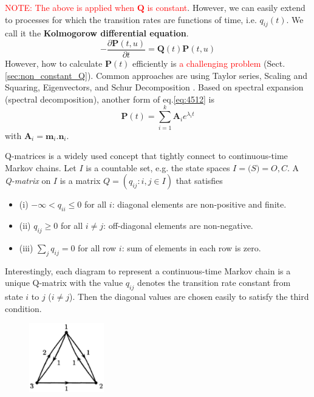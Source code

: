 \textcolor{red}{NOTE: The above is applied when $\mathbf{Q}$ is constant}.
However, we can easily extend to processes for which the transition rates are
functions of time, i.e.  $q_{ij}(t)$. We call it the {\bf Kolmogorow
differential equation}.
\begin{equation}
-\frac{\partial \mathbf{P}(t,u)}{\partial t} = \mathbf{Q}(t) \mathbf{P}(t,u)
\end{equation}
However, how to calculate $\mathbf{P}(t)$ efficiently is \textcolor{red}{a
challenging problem} (Sect.\ref{sec:non_constant_Q}). Common approaches are
using Taylor series, Scaling and Squaring, Eigenvectors, and Schur Decomposition
\citep{moler2003,smalls2007}. Based on  spectral expansion (spectral
decomposition), another form of eq.\ref{eq:4512} is
\begin{equation}
\mathbf{P}(t) = \sum_{i=1}^{k} \mathbf{A}_i e^{\lambda_i t}
\end{equation}
with $\mathbf{A}_i=\mathbf{m}_i.\mathbf{n}_i$.


Q-matrices is a widely used concept that tightly connect to
continuous-time Markov chains. Let $I$ is a countable set, e.g. the
state spaces $I = \mathcal(S) = {O,C}$. A {\it Q-matrix} on $I$ is a
matrix $Q=(q_{ij}:i,j\in I)$ that satisfies
\begin{itemize}
\item (i) $-\infty < q_{ii} \le 0$ for all $i$: diagonal elements are
  non-positive and finite.

\item (ii) $q_{ij} \ge 0$ for all $i\ne j$: off-diagonal elements are
  non-negative.

\item (iii) $\sum_{j}q_{ij} =0$ for all row $i$: sum of elements in
  each row is zero.
\end{itemize}

Interestingly, each diagram to represent a continuous-time Markov
chain is a unique Q-matrix with the value $q_{ij}$ denotes the
transition rate constant from state $i$ to $j$ ($i\ne j$). Then the
diagonal values are chosen easily to satisfy the third condition.

\begin{figure}[hbt]
 \centerline{\includegraphics[height=3cm]{./images/markov_chain_sample1.eps}}
\caption{}
\label{fig:Mkv_chain}
\end{figure}

